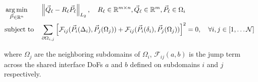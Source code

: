 %
\begin{equation}
	\begin{aligned}
		& \argmin_{\vec{P} \in \mathbb{R}^n} & & \left\lVert \vec{Q}_{\ell} - R_{\ell} \vec{P}_{\ell} \right\rVert_{L_2}, \quad R_{\ell} \in \mathbb{R}^{m \times n}, \vec{Q}_{\ell} \in \mathbb{R}^m, \vec{P}_{\ell} \in \Omega_i \\
		& \text{subject to} & & \sum_{\partial \Omega_{i,j}} \left[ \mathcal{F}_{ij}( \vec{P}_{i}(\Delta_i), \vec{P}_{j}(\Omega_j) )  + \mathcal{F}_{ij}( \vec{P}_{i}(\delta_i), \vec{P}_{j}(\Omega_j) )  \right]^2 = 0, \quad \forall i, j \in [1,\ldots\mathcal{N}]
		\label{eq:nonlinear-residuals}
	\end{aligned}
\end{equation}

where $\Omega_j$ are the neighboring subdomains of $\Omega_i$, $\mathcal{F}_{ij}(a,b)$ is the jump term across the shared interface DoFs $a$ and $b$ defined on subdomains $i$ and $j$ respectively. 


